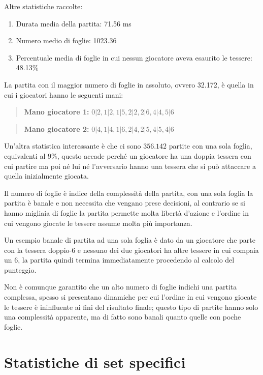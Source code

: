 \documentclass[a4paper,12pt]{report} %
\begin{document}
\vspace{0.5cm}

Altre statistiche raccolte:
\begin{enumerate}
    \item Durata media della partita: 71.56 ms
    \item Numero medio di foglie: 1023.36
    \item Percentuale media di foglie in cui nessun giocatore aveva esaurito le tessere: 48.13\%
\end{enumerate}

La partita con il maggior numero di foglie in assoluto, ovvero 32.172, è quella in cui i giocatori hanno le seguenti mani:

\begin{quote}
    \textbf{Mano giocatore 1:} \(0|2, 1|2, 1|5, 2|2, 2|6, 4|4, 5|6\)
\end{quote}

\begin{quote}
    \textbf{Mano giocatore 2:} \(0|4, 1|4, 1|6, 2|4, 2|5, 4|5, 4|6\) 
\end{quote}



Un'altra statistica interessante è che ci sono \( 356.142 \) partite con una sola foglia, equivalenti al \( 9\%\), questo accade perché un giocatore ha una doppia tessera con cui partire ma poi né lui né l'avversario hanno una tessera che si può attaccare a quella inizialmente giocata.


Il numero di foglie è indice della complessità della partita, con una sola foglia la partita è banale e non necessita che vengano prese decisioni, al contrario se si hanno migliaia di foglie la partita permette molta libertà d'azione e l'ordine in cui vengono giocate le tessere assume molta più importanza.


Un esempio banale di partita ad una sola foglia è dato da un giocatore che parte con la tessera doppio-6 e nessuno dei due giocatori ha altre tessere in cui compaia un 6, la partita quindi termina immediatamente procedendo al calcolo del punteggio.


Non è comunque garantito che un alto numero di foglie indichi una partita complessa, spesso si presentano dinamiche per cui l'ordine in cui vengono giocate le tessere è ininfluente ai fini del risultato finale; questo tipo di partite hanno solo una complessità apparente, ma di fatto sono banali quanto quelle con poche foglie.


\section{Statistiche di set specifici}
\end{document}
